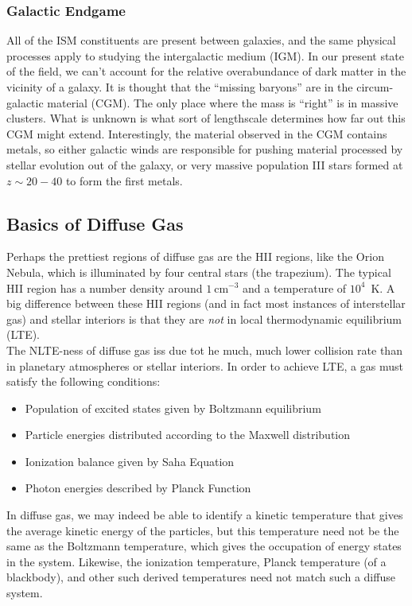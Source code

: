 \documentclass[10pt]{article}
\numberwithin{equation}{section}
\newcommand{\n}{\noindent}
\begin{document}
\subsubsection{Galactic Endgame} %
\label{ssub:galactic_endgame}
All of the ISM constituents are present between galaxies, and the same physical
processes apply to studying the intergalactic medium (IGM). In our present
state of the field, we can't account for the relative overabundance of dark
matter in the vicinity of a galaxy. It is thought that the ``missing baryons''
are in the circum-galactic material (CGM). The only place where the mass is
``right'' is in massive clusters. What is unknown is what sort of lengthscale
determines how far out this CGM might extend. Interestingly, the material
observed in the CGM contains metals, so either galactic winds are responsible
for pushing material processed by stellar evolution out of the galaxy, or very
massive population III stars formed at $z\sim 20-40$ to form the first metals.
\subsection{Basics of Diffuse Gas} %
\label{sub:basics_of_diffuse_gas}
Perhaps the prettiest regions of diffuse gas are the HII regions, like the
Orion Nebula, which is illuminated by four central stars (the trapezium). The
typical HII region has a number density around $1\ \mathrm{cm^{-3}}$ and a
temperature of $10^4$\ K. A big difference between these HII regions (and in
fact most instances of interstellar gas) and stellar interiors is that they are
\emph{not} in local thermodynamic equilibrium (LTE).\\

\n The NLTE-ness of diffuse gas iss due tot he much, much lower collision rate
than in planetary atmospheres or stellar interiors. In order to achieve LTE, a
gas must satisfy the following conditions:
\begin{itemize}
  \item Population of excited states given by Boltzmann equilibrium
  \item Particle energies distributed according to the Maxwell distribution
  \item Ionization balance given by Saha Equation
  \item Photon energies described by Planck Function
\end{itemize}
In diffuse gas, we may indeed be able to identify a kinetic temperature that
gives the average kinetic energy of the particles, but this temperature need
not be the same as the Boltzmann temperature, which gives the occupation of
energy states in the system. Likewise, the ionization temperature, Planck
temperature (of a blackbody), and other such derived temperatures need not
match such a diffuse system.
\end{document}
